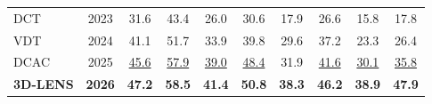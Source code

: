 \documentclass[border=4pt]{standalone}
\begin{document}
\begin{tabular}{l c cccc cccc}
            DCT & 2023
            & 31.6 & 43.4 & 26.0 & 30.6
            & 17.9 & 26.6 & 15.8 & 17.8 \\

            VDT & 2024
            & 41.1 & 51.7 & 33.9 & 39.8
            & 29.6 & 37.2 & 23.3 & 26.4 \\

            DCAC & 2025
            & \underline{45.6} & \underline{57.9} & \underline{39.0} & \underline{48.4}
            & 31.9 & \underline{41.6} & \underline{30.1} & \underline{35.8} \\

            \midrule

            \textbf{3D-LENS} & \textbf{2026}
            & \textbf{47.2} & \textbf{58.5} & \textbf{41.4} & \textbf{50.8}
            & \textbf{38.3} & \textbf{46.2} & \textbf{38.9} & \textbf{47.9} \\

            \bottomrule
        \end{tabular}
\end{document}
